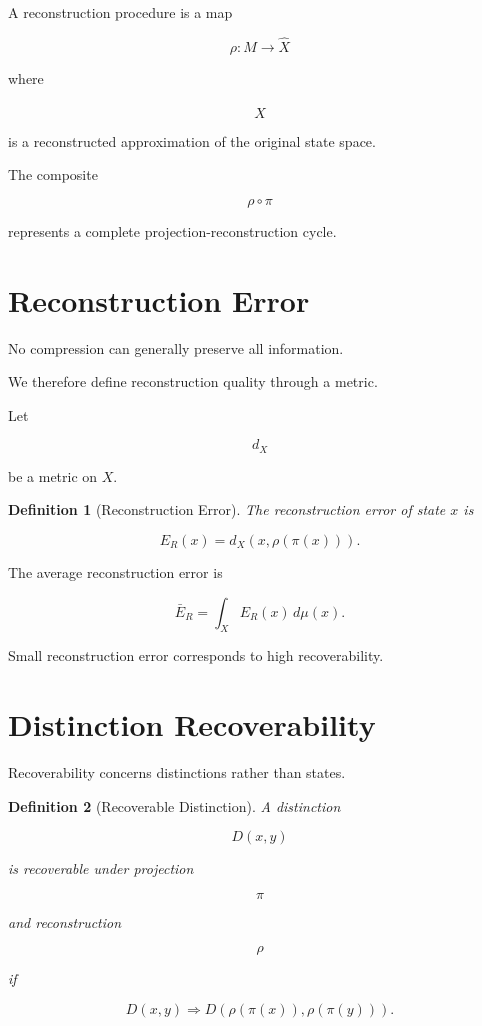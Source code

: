 \documentclass[11pt,oneside,openany]{book}
\newtheorem{definition}{Definition}[chapter] \newtheorem{theorem}{Theorem}[chapter] \newtheorem{proposition}{Proposition}[chapter] \newtheorem{lemma}{Lemma}[chapter] \newtheorem{corollary}{Corollary}[chapter] \newtheorem{remark}{Remark}[chapter]
\begin{document}
A reconstruction procedure is a map

\[
\rho:M\rightarrow \hat X
\]

where

\[
\hat X
\]

is a reconstructed approximation of the original state space.

The composite

\[
\rho\circ\pi
\]

represents a complete projection-reconstruction cycle.

\section{Reconstruction Error}

No compression can generally preserve all information.

We therefore define reconstruction quality through a metric.

Let

\[
d_X
\]

be a metric on \(X\).

\begin{definition}[Reconstruction Error]

The reconstruction error of state \(x\) is

\[
E_R(x)
=
d_X
\left(
x,
\rho(\pi(x))
\right).
\]

\end{definition}

The average reconstruction error is

\[
\bar E_R
=
\int_X
E_R(x)
\,d\mu(x).
\]

Small reconstruction error corresponds to high recoverability.

\section{Distinction Recoverability}

Recoverability concerns distinctions rather than states.

\begin{definition}[Recoverable Distinction]

A distinction

\[
D(x,y)
\]

is recoverable under projection

\[
\pi
\]

and reconstruction

\[
\rho
\]

if

\[
D(x,y)
\Longrightarrow
D\!\left(
\rho(\pi(x)),
\rho(\pi(y))
\right).
\]

\end{definition}
\end{document}
